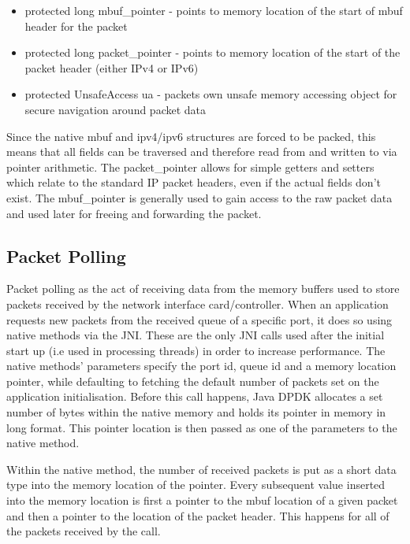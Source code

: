 \documentclass[final_report.tex]{subfiles}
\begin{document}
\begin{itemize}
	\item protected long mbuf\_pointer - points to memory location of the start of mbuf header for the packet
	\item protected long packet\_pointer - points to memory location of the start of the packet header (either IPv4 or IPv6)
	\item protected UnsafeAccess ua - packets own unsafe memory accessing object for secure navigation around packet data
\end{itemize}

Since the native mbuf and ipv4/ipv6 structures are forced to be packed,  this means that all fields can be traversed and therefore read from and written to via pointer arithmetic. The packet\_pointer allows for simple getters and setters which relate to the standard IP packet headers, even if the actual fields don't exist. The mbuf\_pointer is generally used to gain access to the raw packet data and used later for freeing and forwarding the packet.

\subsection{Packet Polling}
Packet polling as the act of receiving data from the memory buffers used to store packets received by the network interface card/controller. When an application requests new packets from the received queue of a specific port, it does so using native methods via the JNI. These are the only JNI calls used after the initial start up (i.e used in processing threads) in order to increase performance. The native methods' parameters specify the port id, queue id and a memory location pointer, while defaulting to fetching the default number of packets set on the application initialisation. Before this call happens, Java DPDK allocates a set number of bytes within the native memory and holds its pointer in memory in long format. This pointer location is then passed as one of the parameters to the native method.


Within the native method, the number of received packets is put as a short data type into the memory location of the pointer. Every subsequent value inserted into the memory location is first a pointer to the mbuf location of a given packet and then a pointer to the location of the packet header. This happens for all of the packets received by the call.
\end{document}
